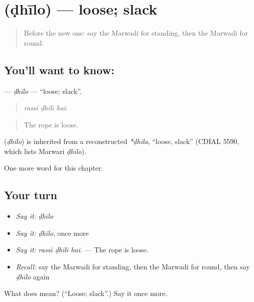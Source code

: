 \section[\texorpdfstring{\mw{ढीलो} (ḍhīlo)}{ढीलो (ḍhīlo)}]{ (ḍhīlo) — loose; slack}

\label{lesson:MW-C231-dhilo}



\begin{quote}
Before the new one: say the Marwadi for standing, then the Marwadi for round.
\end{quote}

\subsection*{You'll want to know: }
\textbf{} — \emph{ḍhīlo} — \textquotedblleft{}loose; slack\textquotedblright{}.

\begin{quote}
  
\end{quote}

\begin{quote}
\emph{rassī ḍhīlī hai.}
\end{quote}

\begin{quote}
The rope is loose.
\end{quote}

\begin{cousinweb}
\textbf{} (\emph{ḍhīlo}) is inherited from a reconstructed \emph{*ḍhila}, \textquotedblleft{}loose, slack\textquotedblright{} (CDIAL 5590, which lists Marwari \emph{ḍhīlo}).
\end{cousinweb}

\begin{grammarlens}[title={What you've built}]
One more word for this chapter.
\end{grammarlens}

\subsection*{Your turn}
\begin{itemize}
\raggedright
  \item \emph{Say it:} \emph{ḍhīlo}
  \item \emph{Say it:} \emph{ḍhīlo}, once more
  \item \emph{Say it:} \emph{rassī ḍhīlī hai.} — The rope is loose.
  \item \emph{Recall:} say the Marwadi for standing, then the Marwadi for round, then say \emph{ḍhīlo} again
\end{itemize}

\begin{tcolorbox}[breakable,colback=teal!4,colframe=teal!35!black,title={Before you move on}]
What does  mean? (\textquotedblleft{}Loose; slack\textquotedblright{}.) Say it once more.
\end{tcolorbox}
